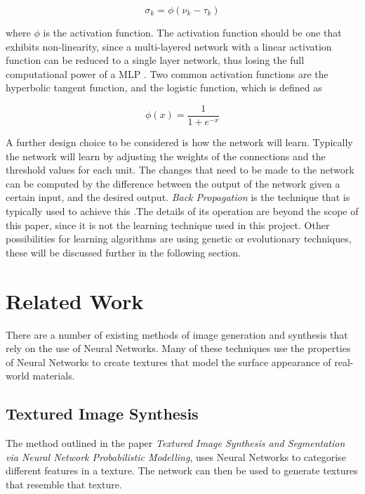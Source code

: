 \documentclass{acm_proc_article-sp}
\begin{document}
\begin{equation}
\sigma_{k} = \phi(\nu_{k} - \tau_{k})
\end{equation}

where $\phi$ is the activation function. The activation function should be one that exhibits non-linearity, since a multi-layered network with a linear activation function can be reduced to a single layer network, thus losing the full computational power of a MLP \cite{springerlink}. Two common activation functions are the hyperbolic tangent function, and the logistic function, which is defined as

\begin{equation}
\label{eqn:logistic}
\phi(x) = \frac{1}{1 + e^{-x}}
\end{equation}

\vspace{3mm}

A further design choice to be considered is how the network will learn. Typically the network will learn by adjusting the weights of the connections and the threshold values for each unit. The changes that need to be made to the network can be computed by the difference between the output of the network given a certain input, and the desired output. \textit{Back Propagation} is the technique that is typically used to achieve this \cite{bertsekas1995nonlinear}.The details of its operation are beyond the scope of this paper, since it is not the learning technique used in this project. Other possibilities for learning algorithms are using genetic or evolutionary techniques, these will be discussed further in the following section.

\section{Related Work}
\label{sec:related}

There are a number of existing methods of image generation and synthesis that rely on the use of Neural Networks. Many of these techniques use the properties of Neural Networks to create textures that model the surface appearance of real-world materials. 

\subsection{Textured Image Synthesis}
The method outlined in the paper \textit{Textured Image Synthesis and Segmentation via Neural Network Probabilistic Modelling}\cite{Hwang_texturedimage}, uses Neural Networks to categorise different features in a texture. The network can then be used to generate textures that resemble that texture. 
\end{document}
